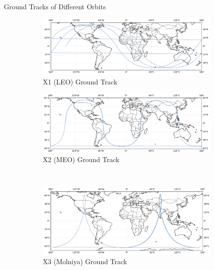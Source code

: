 \begin{hwkProblem}{3}{Ground Tracks of Different Orbits}
	\begin{figure}[H] \label{fig:s03a}
		\begin{center}
			\begin{subfigure}{0.4\textwidth} \label{fig:s03a1}
				\includegraphics[width=\linewidth]{./outputs/figures/s03a1.png}
				\caption{X1 (LEO) Ground Track}
			\end{subfigure}
			\begin{subfigure}{0.4\textwidth} \label{fig:s03a2}
				\includegraphics[width=\linewidth]{./outputs/figures/s03a2.png}
				\caption{X2 (MEO) Ground Track}
			\end{subfigure}
			\\
			\begin{subfigure}{0.4\textwidth} \label{fig:s03a3}
				\includegraphics[width=\linewidth]{./outputs/figures/s03a3.png}
				\caption{X3 (Molniya) Ground Track}
			\end{subfigure}
			\begin{subfigure}{0.4\textwidth} \label{fig:s03a4}

\end{subfigure}
\end{center}
\end{figure}
\end{hwkProblem}
